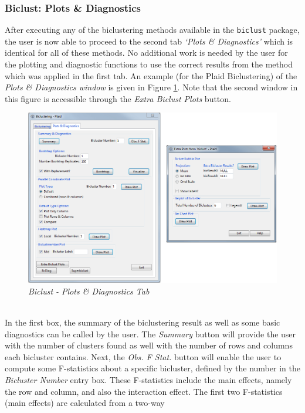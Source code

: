 \documentclass[a4paper]{article}\usepackage[]{graphicx}\usepackage[]{color}
\begin{document}
\subsubsection{Biclust: Plots \& Diagnostics}\label{sec:biclustplots}
After executing any of the biclustering methods available in the
\verb|biclust| package, the user is now able to proceed to the second tab {\it
`Plots \& Diagnostics'} which is identical for all of these methods.
No additional work is needed by the user for the plotting and diagnostic
functions to use the correct results from the method which was applied in the
first tab. An example (for the Plaid Biclustering) of the {\it Plots \&
Diagnostics window} is given in Figure \ref{biclust_plotdiagtab}.
Note that the second window in this figure is accessible through the {\it Extra
Biclust Plots} button.
\begin{figure}[H]
\centering
\includegraphics[scale=0.45]{figures/biclust_plotdiagtab.png}
\caption{{\it Biclust - Plots \& Diagnostics Tab}\label{biclust_plotdiagtab}}
\end{figure}
\\
\noindent In the first box, the summary of the biclustering result as well as
some basic diagnostics can be called by the user. The {\it Summary} button will
provide the user with the number of clusters found as well with the number of
rows and columns each bicluster contains. Next, the {\it Obs. F Stat.} button
will enable the user to compute some F-statistics about a specific bicluster,
defined by the number in the {\it Bicluster Number} entry box. These
F-statistics include the main effects, namely the row and column, and also the interaction
effect. The first two F-statistics (main effects) are calculated from a two-way
\end{document}
